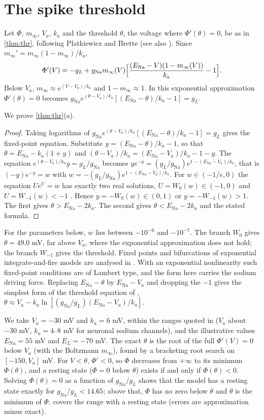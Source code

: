 \documentclass[11pt]{article}
\theoremstyle{definition}\newtheorem{definition}[theorem]{Definition}
\theoremstyle{remark}\newtheorem{remark}[theorem]{Remark}
\begin{document}
\section{The spike threshold}\label{sec:thr}
Let $\Phi$, $m_\infty$, $V_a$, $k_a$ and the threshold $\theta$, the voltage where $\Phi'(\theta)=0$, be as in \cref{thm:thr}, following Platkiewicz and Brette \cite{PB} (see also \cite{FT}). Since $m_\infty'=m_\infty(1-m_\infty)/k_a$,
\[
\Phi'(V)=-g_L+g_\mathrm{Na}m_\infty(V)\Bigl[\frac{(E_\mathrm{Na}-V)(1-m_\infty(V))}{k_a}-1\Bigr].
\]
Below $V_a$, $m_\infty\approx e^{(V-V_a)/k_a}$ and $1-m_\infty\approx1$. In this exponential approximation $\Phi'(\theta)=0$ becomes $g_\mathrm{Na}e^{(\theta-V_a)/k_a}[(E_\mathrm{Na}-\theta)/k_a-1]=g_L$.

We prove \cref{thm:thr}(a).
\begin{proof}
Taking logarithms of $g_\mathrm{Na}e^{(\theta-V_a)/k_a}[(E_\mathrm{Na}-\theta)/k_a-1]=g_L$ gives the fixed-point equation. Substitute $y=(E_\mathrm{Na}-\theta)/k_a-1$, so that $\theta=E_\mathrm{Na}-k_a(1+y)$ and $(\theta-V_a)/k_a=(E_\mathrm{Na}-V_a)/k_a-1-y$. The equation $e^{(\theta-V_a)/k_a}y=g_L/g_\mathrm{Na}$ becomes $ye^{-y}=(g_L/g_\mathrm{Na})e^{1-(E_\mathrm{Na}-V_a)/k_a}$, that is $(-y)e^{-y}=w$ with $w=-(g_L/g_\mathrm{Na})e^{1-(E_\mathrm{Na}-V_a)/k_a}$. For $w\in(-1/e,0)$ the equation $Ue^U=w$ has exactly two real solutions, $U=W_0(w)\in(-1,0)$ and $U=W_{-1}(w)<-1$ \cite{Corless}. Hence $y=-W_0(w)\in(0,1)$ or $y=-W_{-1}(w)>1$. The first gives $\theta>E_\mathrm{Na}-2k_a$. The second gives $\theta<E_\mathrm{Na}-2k_a$ and the stated formula.
\end{proof}

For the parameters below, $w$ lies between $-10^{-6}$ and $-10^{-7}$. The branch $W_0$ gives $\theta=49.0$ mV, far above $V_a$, where the exponential approximation does not hold; the branch $W_{-1}$ gives the threshold. Fixed points and bifurcations of exponential integrate-and-fire models are analysed in \cite{TouboulBrette}. With an exponential nonlinearity such fixed-point conditions are of Lambert type, and the form here carries the sodium driving force. Replacing $E_\mathrm{Na}-\theta$ by $E_\mathrm{Na}-V_a$ and dropping the $-1$ gives the simplest form of the threshold equation of \cite{PB}, $\theta\approx V_a-k_a\ln[(g_\mathrm{Na}/g_L)(E_\mathrm{Na}-V_a)/k_a]$.

We take $V_a=-30$ mV and $k_a=6$ mV, within the ranges quoted in \cite{PB} ($V_a$ about $-30$ mV, $k_a=4$--$8$ mV for neuronal sodium channels), and the illustrative values $E_\mathrm{Na}=55$ mV and $E_L=-70$ mV. The exact $\theta$ is the root of the full $\Phi'(V)=0$ below $V_a$ (with the Boltzmann $m_\infty$), found by a bracketing root search on $[-150,V_a]$ mV. For $V<\theta$, $\Phi'<0$, so $\Phi$ decreases from $+\infty$ to its minimum $\Phi(\theta)$, and a resting state ($\Phi=0$ below $\theta$) exists if and only if $\Phi(\theta)<0$. Solving $\Phi(\theta)=0$ as a function of $g_\mathrm{Na}/g_L$ shows that the model has a resting state exactly for $g_\mathrm{Na}/g_L<14.65$; above that, $\Phi$ has no zero below $\theta$ and $\theta$ is the minimum of $\Phi$.  covers the range with a resting state (errors are approximation minus exact).
\end{document}
